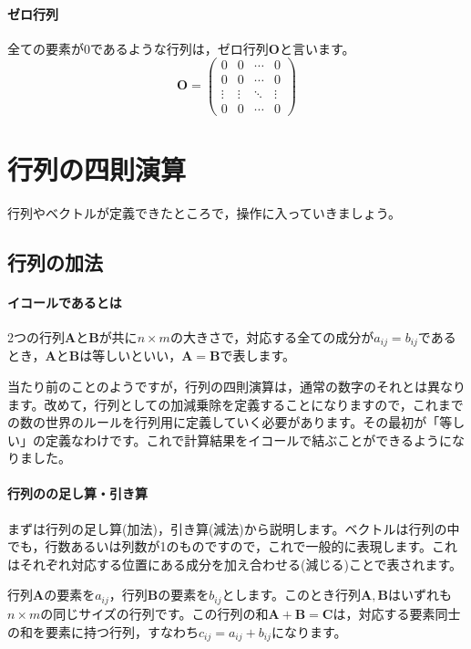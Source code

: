 \documentclass{ltjsbook}
\begin{document}
\paragraph{ゼロ行列}
全ての要素が$0$であるような行列は，ゼロ行列$\bm{O}$と言います。
\[ \bm{O} = \begin{pmatrix}
        0      & 0      & \cdots & 0      \\
        0      & 0      & \cdots & 0      \\
        \vdots & \vdots & \ddots & \vdots \\
        0      & 0      & \cdots & 0
    \end{pmatrix}
\]

\section{行列の四則演算}
行列やベクトルが定義できたところで，操作に入っていきましょう。


\subsection{行列の加法}
\paragraph{イコールであるとは}
2つの行列$\bm{A}$と$\bm{B}$が共に$n \times m$の大きさで，対応する全ての成分が$a_{ij}=b_{ij}$であるとき，$\bm{A}$と$\bm{B}$は等しいといい，$\bm{A}=\bm{B}$で表します。

当たり前のことのようですが，行列の四則演算は，通常の数字のそれとは異なります。改めて，行列としての加減乗除を定義することになりますので，これまでの数の世界のルールを行列用に定義していく必要があります。その最初が「等しい」の定義なわけです。これで計算結果をイコールで結ぶことができるようになりました。

\paragraph{行列のの足し算・引き算}
まずは行列の足し算(加法)，引き算(減法)から説明します。ベクトルは行列の中でも，行数あるいは列数が1のものですので，これで一般的に表現します。これはそれぞれ対応する位置にある成分を加え合わせる(減じる)ことで表されます。

行列$\bm{A}$の要素を$a_{ij}$，行列$\bm{B}$の要素を$b_{ij}$とします。このとき行列$\bm{A},\bm{B}$はいずれも$n \times m$の同じサイズの行列です。この行列の和$\bm{A}+\bm{B}=\bm{C}$は，対応する要素同士の和を要素に持つ行列，すなわち$c_{ij} = a_{ij}+b_{ij}$になります。
\end{document}
